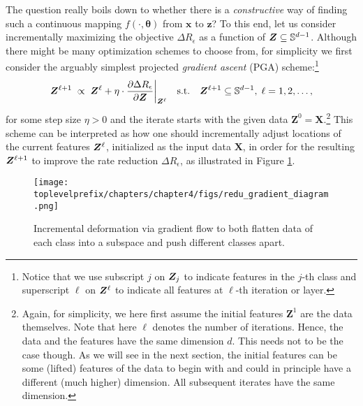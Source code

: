 \documentclass[\toplevelprefix/book-main.tex]{subfiles}
\begin{document}
The question really boils down to whether there is a {\em constructive} way of finding such a continuous mapping $f(\cdot,\bm \theta)$ from $\bm x$ to $\bm z$? To this end, let us consider incrementally maximizing the objective $\Delta R_{\epsilon}$ as a function of $\bm{Z} \subseteq \mathbb{S}^{d-1}$. Although there might be many optimization schemes to choose from, for simplicity we first consider the arguably simplest projected {\em gradient ascent} (PGA)  scheme:\footnote{Notice that we use subscript $j$ on $\bm{Z}_j$ to indicate features in the $j$-th class and superscript $\ell$ on $\bm{Z}^{\ell}$ to indicate all features at $\ell$-th iteration or layer.} 
\begin{equation}
\bm Z^{\ell+1}   \; \propto \; \bm Z^{\ell} + \eta \cdot \frac{\partial \Delta R_{\epsilon}}{\partial \bm Z}\bigg|_{\bm{Z}^{\ell}}
\quad \mbox{s.t.} \quad \bm{Z}^{\ell+1} \subseteq \mathbb{S}^{d-1}, \; \ell = 1, 2, \ldots,
\label{eqn:gradient-descent}
\end{equation}
for some step size $\eta >0$ and the iterate starts with the given data $\bm Z^{0} = \bm X$.\footnote{Again, for simplicity, we here first assume the initial features $\bm Z^{1}$ are the data themselves. Note that here $\ell$ denotes the number of iterations. Hence, the data and the features have the same dimension $d$. This needs not to be the case though. As we will see in the next section, the initial features can be some (lifted) features of the data to begin with and could in principle have a different (much higher) dimension. All subsequent iterates have the same dimension.}
This scheme can be interpreted as how one should incrementally adjust locations of the current features $\bm{Z}^\ell$, initialized as the input data $\bm X$, in order for the resulting $\bm{Z}^{\ell +1}$ to improve the rate reduction $\Delta R_{\epsilon}$, as illustrated in Figure \ref{fig:gradient-flow}. 
\begin{figure}
\centering
    \texttt{[image: \\toplevelprefix/chapters/chapter4/figs/redu\_gradient\_diagram.png]} 
    \caption{Incremental deformation via gradient flow to both flatten data of each class into a subspace and push different classes apart.} 
    \label{fig:gradient-flow}
\end{figure} 

\end{document}
